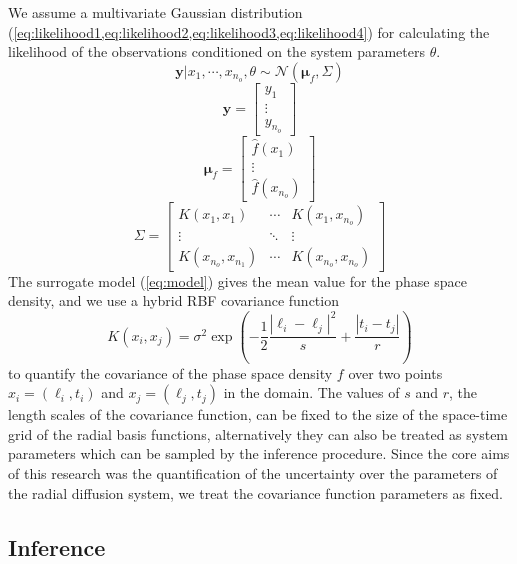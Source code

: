 We assume a multivariate Gaussian distribution 
(\cref{eq:likelihood1,eq:likelihood2,eq:likelihood3,eq:likelihood4}) for calculating the 
likelihood of the observations conditioned on the system parameters $\theta$.  
%
\begin{equation}\label{eq:likelihood1}
\mathbf{y} | x_1, \cdots, x_{n_o}, \theta \sim \mathcal{N} \left(\mathbf{\mu}_f, \Sigma \right )
\end{equation}
%
\begin{equation}\label{eq:likelihood2}
\mathbf{y} = \begin{bmatrix}
y_1\\ 
\vdots\\ 
y_{n_o}
\end{bmatrix}
\end{equation}
%
\begin{equation}\label{eq:likelihood3}
  \mathbf{\mu}_f = \begin{bmatrix}
\hat{f}(x_1)\\ 
\vdots\\ 
\hat{f}(x_{n_o})
\end{bmatrix}
\end{equation}
%
\begin{equation}\label{eq:likelihood4}
    \Sigma = \begin{bmatrix}
K(x_1, x_1) & \cdots  & K(x_1, x_{n_o})\\ 
\vdots & \ddots & \vdots\\ 
K(x_{n_o}, x_{n_{1}}) & \cdots  & K(x_{n_o}, x_{n_{o}})
\end{bmatrix}
\end{equation}
%
The surrogate model (\cref{eq:model}) gives the mean value for the phase space density, and we use 
a hybrid RBF covariance function 
\[
  K(x_{i}, x_{j}) = \sigma^2 \exp \left(
    -\frac{1}{2} \frac{|\ell_i - \ell_j|^2}{s} + \frac{|t_i - t_j|}{r}
  \right)  
\] 
to quantify the covariance of the phase space density $f$ over two points $x_i = (\ell_i, t_i)$ and 
$x_j = (\ell_j, t_j)$ in the domain. The values of $s$ and $r$, the length scales of the covariance 
function, can be fixed to the size of the space-time grid of the radial basis functions, 
alternatively they can also be treated as system parameters which can be sampled by the inference 
procedure. Since the core aims of this research was the quantification of the uncertainty over the 
parameters of the radial diffusion system, we treat the covariance function parameters as fixed.

\subsection{Inference}

